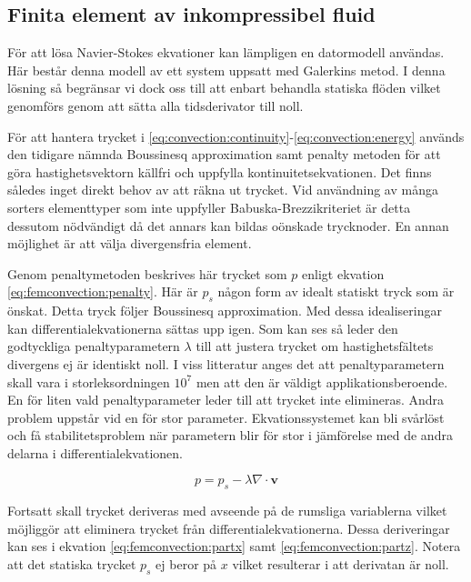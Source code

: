 \subsection{Finita element av inkompressibel fluid}

För att lösa Navier-Stokes ekvationer kan lämpligen en datormodell användas.
Här består denna modell av ett system uppsatt med Galerkins metod.
I denna lösning så begränsar vi dock oss till att enbart behandla statiska flöden
vilket genomförs genom att sätta alla tidsderivator till noll.

För att hantera trycket i \eqref{eq:convection:continuity}-\eqref{eq:convection:energy} används den tidigare nämnda Boussinesq approximation
samt penalty metoden för att göra hastighetsvektorn källfri och uppfylla
kontinuitetsekvationen. Det finns således inget direkt behov av att räkna ut trycket.
Vid användning av många sorters elementtyper som inte uppfyller Babuska-Brezzikriteriet
är detta dessutom nödvändigt då det annars kan bildas oönskade trycknoder. 
En annan möjlighet är att välja divergensfria element. \cite{babuska1973}\cite{segal2011}

Genom penaltymetoden beskrives här trycket som $p$ enligt ekvation
\eqref{eq:femconvection:penalty}. Här är $p_s$ någon form av idealt statiskt
tryck som är önskat. Detta tryck följer Boussinesq approximation. Med dessa
idealiseringar kan differentialekvationerna sättas upp igen. \cite{heinrich88}\cite{taylor79}
Som kan ses så leder den godtyckliga penaltyparametern $\lambda$ till att justera trycket
om hastighetsfältets divergens ej är identiskt noll. I viss litteratur anges 
det att penaltyparametern skall vara i storleksordningen $10^7$ men att den
är väldigt applikationsberoende. En för liten vald penaltyparameter leder till att
trycket inte elimineras. Andra problem uppstår vid en för stor parameter. Ekvationssystemet
kan bli svårlöst och få stabilitetsproblem när parametern blir
för stor i jämförelse med de andra delarna i differentialekvationen.\cite{reddy93}\cite{roy05}\cite{basak04}\cite{segal2011}

\begin{equation}
\label{eq:femconvection:penalty}
p = p_s - \lambda\nabla\cdot\mathbf{v}
\end{equation}

\noindent
Fortsatt skall trycket deriveras med avseende på de rumsliga variablerna vilket möjliggör
att eliminera trycket från differentialekvationerna. Dessa deriveringar kan ses i ekvation
\eqref{eq:femconvection:partx} samt \eqref{eq:femconvection:partz}. Notera att det statiska trycket
$p_s$ ej beror på $x$ vilket resulterar i att derivatan är noll.

